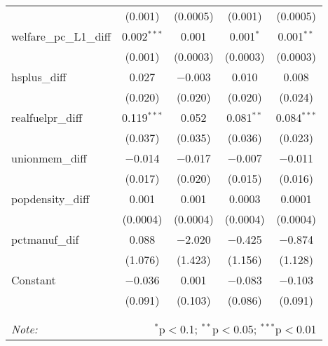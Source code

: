 \begin{table}[!htbp]
\begin{tabular}{@{\extracolsep{5pt}}lcccc}
  & (0.001) & (0.0005) & (0.001) & (0.0005) \\ 
  welfare\_pc\_L1\_diff & 0.002$^{***}$ & 0.001 & 0.001$^{*}$ & 0.001$^{**}$ \\ 
  & (0.001) & (0.0003) & (0.0003) & (0.0003) \\ 
  hsplus\_diff & 0.027 & $-$0.003 & 0.010 & 0.008 \\ 
  & (0.020) & (0.020) & (0.020) & (0.024) \\ 
  realfuelpr\_diff & 0.119$^{***}$ & 0.052 & 0.081$^{**}$ & 0.084$^{***}$ \\ 
  & (0.037) & (0.035) & (0.036) & (0.023) \\ 
  unionmem\_diff & $-$0.014 & $-$0.017 & $-$0.007 & $-$0.011 \\ 
  & (0.017) & (0.020) & (0.015) & (0.016) \\ 
  popdensity\_diff & 0.001 & 0.001 & 0.0003 & 0.0001 \\ 
  & (0.0004) & (0.0004) & (0.0004) & (0.0004) \\ 
  pctmanuf\_dif & 0.088 & $-$2.020 & $-$0.425 & $-$0.874 \\ 
  & (1.076) & (1.423) & (1.156) & (1.128) \\ 
  Constant & $-$0.036 & 0.001 & $-$0.083 & $-$0.103 \\ 
  & (0.091) & (0.103) & (0.086) & (0.091) \\ 
 \hline \\[-1.8ex] 
\hline 
\hline \\[-1.8ex] 
\textit{Note:}  & \multicolumn{4}{r}{$^{*}$p$<$0.1; $^{**}$p$<$0.05; $^{***}$p$<$0.01} \\ 
\end{tabular} 
\end{table} 
